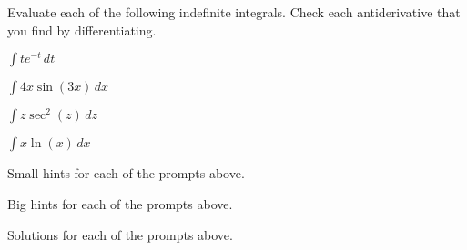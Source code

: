 \begin{activity} \label{A:5.4.1}  Evaluate each of the following indefinite integrals.  Check each antiderivative that you find by differentiating.
\bmtwo
\ba
	\item $\int te^{-t} \, dt$
	\item $\int 4x \sin(3x) \, dx$
	\item $\int z \sec^2(z) \,dz$
	\item $\int x \ln(x) \, dx $
\ea
\emtwo
\end{activity}
\begin{smallhint}
\ba
	\item Small hints for each of the prompts above.
\ea
\end{smallhint}
\begin{bighint}
\ba
	\item Big hints for each of the prompts above.
\ea
\end{bighint}
\begin{activitySolution}
\ba
	\item Solutions for each of the prompts above.
\ea
\end{activitySolution}
\aftera